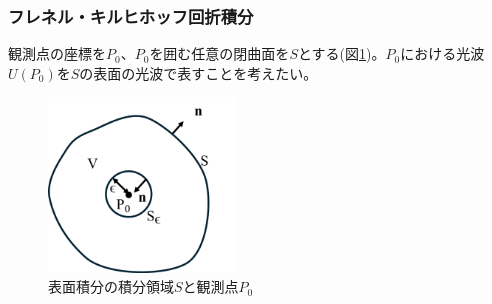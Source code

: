 \documentclass[a4paper,11pt,uplatex]{jsbook}
\begin{document}
\subsubsection{フレネル・キルヒホッフ回折積分}
観測点の座標を$P_0$、$P_0$を囲む任意の閉曲面を$S$とする(図\ref{diff_cord})。$P_0$における光波$U(P_0)$を$S$の表面の光波で表すことを考えたい。
\begin{figure}[H]
  \centering
  \includegraphics[width=5cm]{image/2-diffraction_cordinate.png}
  \caption[回折積分の座標系]{表面積分の積分領域$S$と観測点$P_0$}\label{diff_cord}
\end{figure}
\end{document}

